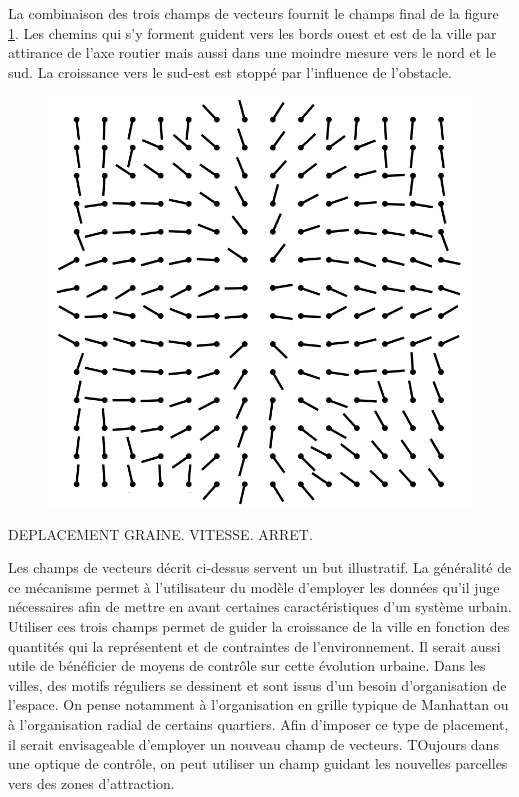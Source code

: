 \documentclass[12pt]{article}
\begin{document}
La combinaison des trois champs de vecteurs fournit le champs final de
la figure \ref{fig:field-sum}. Les chemins qui s'y forment guident
vers les bords ouest et est de la ville par attirance de l'axe routier
mais aussi dans une moindre mesure vers le nord et le sud. La
croissance vers le sud-est est stoppé par l'influence de l'obstacle.

\begin{figure}[H]
  \centering
  \includegraphics[width=.8\linewidth]{images/vf-sum.png}
  \caption{}
  \label{fig:field-sum}
\end{figure}

DEPLACEMENT GRAINE. VITESSE. ARRET.

Les champs de vecteurs décrit ci-dessus servent un but illustratif. La
généralité de ce mécanisme permet à l'utilisateur du modèle d'employer
les données qu'il juge nécessaires afin de mettre en avant certaines
caractéristiques d'un système urbain. Utiliser ces trois champs permet
de guider la croissance de la ville en fonction des quantités qui la
représentent et de contraintes de l'environnement. Il serait aussi
utile de bénéficier de moyens de contrôle sur cette évolution
urbaine. Dans les villes, des motifs réguliers se dessinent et sont
issus d'un besoin d'organisation de l'espace. On pense notamment à
l'organisation en grille typique de Manhattan ou à l'organisation
radial de certains quartiers. Afin d'imposer ce type de placement, il
serait envisageable d'employer un nouveau champ de vecteurs. TOujours
dans une optique de contrôle, on peut utiliser un champ guidant les
nouvelles parcelles vers des zones d'attraction.
\end{document}
